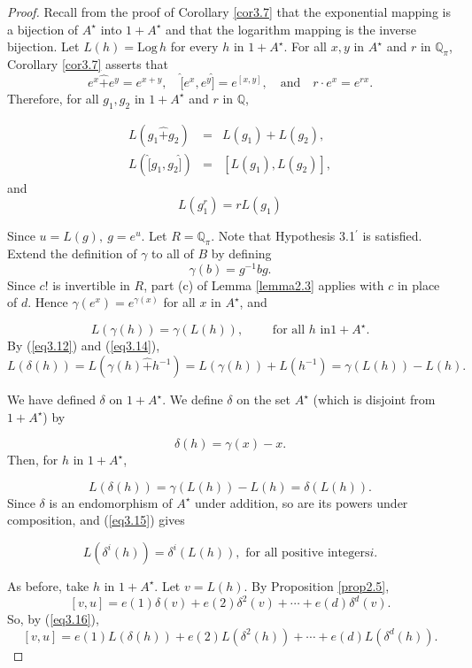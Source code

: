 \documentclass[mathscr]{amsart}
\theoremstyle{theorem}
\theoremstyle{definition}
\numberwithin{equation}{section}
\def \({\left(}
\def \){\right)}
\def \Log{\text{Log}\,}
\begin{document}
\begin{proof}
Recall from the proof of Corollary \ref{cor3.7} that the exponential
mapping is a bijection of $A^\star$ into $1+A^\star$ and that the
logarithm mapping is the inverse bijection.  Let $L(h)=\Log h$ for
every $h$ in $1+A^\star$.  For all $x,y$ in $A^\star$ and $r$ in
$\mathbb{Q}_\pi$, Corollary \ref{cor3.7} asserts that
$$
e^x\hat+ e^y=e^{x+y},\quad
\hat[e^x,e^y\hat]=e^{[x,y]},\quad\text{and}\quad r\cdot e^x=e^{rx}.
$$
Therefore, for all $g_1, g_2$ in $1+A^\star$ and $r$ in
$\mathbb{Q}$,

\begin{eqnarray}
L\(g_1\hat+g_2\)&=&L\(g_1\)+L\(g_2\),\label{eq3.12}\\
L\(\hat[g_1,g_2\hat]\)&=&\left[L\(g_1\),L\(g_2\)\right],\label{eq3.13}
\end{eqnarray}
and
\begin{equation}
L\(g_1^r\)=rL\(g_1\)\label{eq3.14}
\end{equation}

Since $u=L(g),\ g=e^u$.  Let $R=\mathbb{Q}_\pi$.  Note that
Hypothesis 3.1$^\prime$ %
is satisfied.  Extend the definition of $\gamma$ to all of $B$ by
defining
$$\gamma(b)=g^{-1}bg.$$
Since $c!$ is invertible in $R$, part (c) of Lemma \ref{lemma2.3}
applies with $c$ in place of $d$.  Hence
$\gamma\(e^x\)=e^{\gamma(x)}$ for all $x$ in $A^\star$, and

$$L(\gamma(h))=\gamma\(L(h)\),\qquad\text{ for all }h\text{ in
}1+A^\star.
$$
By (\ref{eq3.12}) and (\ref{eq3.14}),
$$
L\(\delta(h)\)=L\(\gamma(h)\hat
+h^{-1}\)=L(\gamma(h))+L\(h^{-1}\)=\gamma(L(h))-L(h).
$$

We have defined $\delta$ on $1+A^\star$.  We define $\delta$ on the
set $A^\star$ (which is disjoint from $1+A^\star$) by

$$
\delta(h)=\gamma(x)-x.
$$
Then, for $h$ in $1+A^\star$,

\begin{equation}\label{eq3.15}
L\(\delta(h)\)=\gamma\(L(h)\)-L(h)=\delta\(L(h)\).
\end{equation}
Since $\delta$ is an endomorphism of $A^\star$ under addition, so
are its powers under composition, and (\ref{eq3.15}) gives

\begin{equation}\label{eq3.16}
L\(\delta^i(h)\)=\delta^i\(L(h)\),\text{ for all positive integers
}i.
\end{equation}

As before, take $h$ in $1+A^\star$.  Let $v=L(h)$.  By Proposition
\ref{prop2.5},
$$
[v,u]=e(1)\delta(v)+e(2)\delta^2(v)+\cdots + e(d)\delta^d(v).
$$
So, by (\ref{eq3.16}),
$$
[v,u]=e(1)L\(\delta(h)\)+e(2)L\(\delta^2(h)\)+\cdots+e(d)L\(\delta^d(h)\).
$$


\end{proof}
\end{document}
